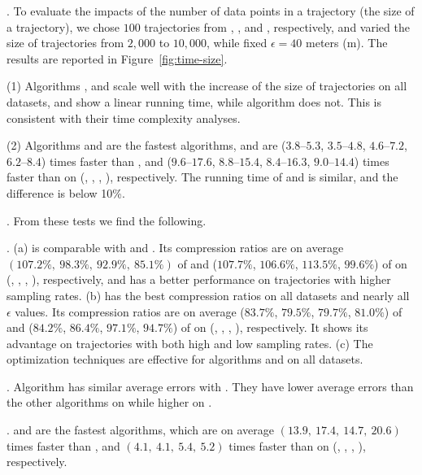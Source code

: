 .
To evaluate the impacts of the number of data points in a trajectory (\ie the size of a trajectory),
we chose $100$ trajectories from \taxi, \truck, \ucar and \geolife, respectively,
and varied the size  of trajectories from $2,000$ to $10,000$, while fixed $\epsilon = 40$ meters (m).
The results are reported in Figure~\ref{fig:time-size}.

\sstab(1) Algorithms \operb, \operba and \fbqsa  scale well with the increase of the size of trajectories on all datasets,
and show a linear running time, while algorithm \dpa does not.
This is consistent with their time complexity analyses.

\sstab(2) Algorithms \operb and \operba are the fastest \lsa algorithms, and are {($3.8$--$5.3$, $3.5$--$4.8$, $4.6$--$7.2$, $6.2$--$8.4$)} times faster than \fbqsa,
and {($9.6$--$17.6$, $8.8$--$15.4$, $8.4$--$16.3$, $9.0$--$14.4$)} times faster than \dpa on (\taxi, \truck, \ucar, \geolife), respectively. The running time of \operb and \operba is similar, and the difference is below 10\%.

.
From these tests we find the following.

\emph{}. (a) \operb is comparable {with \fbqsa and \dpa}. Its compression ratios are on average $(107.2\%, ~98.3\%, ~92.9\%, ~85.1\%)$ of \fbqsa and ($107.7\%$, $106.6\%$, $113.5\%$, $99.6\%$) of \dpa on (\taxi, \truck, \ucar, \geolife), respectively, and \operb has a better performance on trajectories with higher sampling rates.
(b) \operba has the best compression ratios on all datasets and nearly all $\epsilon$ values.
Its compression ratios are on average {($83.7\%$, $79.5\%$, $79.7\%$, $81.0\%$)} of \fbqsa and {($84.2\%$, $86.4\%$, $97.1\%$, $94.7\%$)} of \dpa on (\taxi, \truck, \ucar, \geolife), respectively.
It shows its advantage on trajectories with both high and low sampling rates.
(c) The optimization techniques are effective for algorithms \operb and \operba on all datasets.

\emph{}. {Algorithm \operb has similar average errors with \operba. They have lower average errors than the other algorithms on \taxi while higher on \ucar.}


\emph{}. \operb and \operba are the fastest algorithms, which are on average $(13.9, ~17.4, ~14.7, {~20.6})$ times faster than \dpa, and $(4.1,~4.1,~5.4, {~5.2})$
times faster than \fbqsa on (\taxi, \truck, \ucar, \geolife), respectively.




